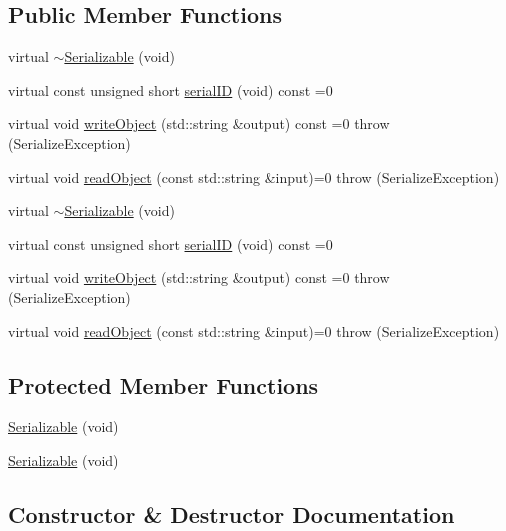 \subsection*{Public Member Functions}
\begin{DoxyCompactItemize}
\item 
virtual \mbox{\hyperlink{classFILEDB_1_1Serializable_aac7656fa828dd044ad98d50cb7de1084}{$\sim$\+Serializable}} (void)
\item 
virtual const unsigned short \mbox{\hyperlink{classFILEDB_1_1Serializable_a5d639b5dbd5d8ebc7dca1eca31bbc868}{serial\+ID}} (void) const =0
\item 
virtual void \mbox{\hyperlink{classFILEDB_1_1Serializable_a8deaa86e108c08c863881e46cf5578ea}{write\+Object}} (std\+::string \&output) const =0  throw (\+Serialize\+Exception)
\item 
virtual void \mbox{\hyperlink{classFILEDB_1_1Serializable_a21a5831fa4f65790490a8a5eba9fcab2}{read\+Object}} (const std\+::string \&input)=0  throw (\+Serialize\+Exception)
\item 
virtual \mbox{\hyperlink{classFILEDB_1_1Serializable_aac7656fa828dd044ad98d50cb7de1084}{$\sim$\+Serializable}} (void)
\item 
virtual const unsigned short \mbox{\hyperlink{classFILEDB_1_1Serializable_a5d639b5dbd5d8ebc7dca1eca31bbc868}{serial\+ID}} (void) const =0
\item 
virtual void \mbox{\hyperlink{classFILEDB_1_1Serializable_a8deaa86e108c08c863881e46cf5578ea}{write\+Object}} (std\+::string \&output) const =0  throw (\+Serialize\+Exception)
\item 
virtual void \mbox{\hyperlink{classFILEDB_1_1Serializable_a21a5831fa4f65790490a8a5eba9fcab2}{read\+Object}} (const std\+::string \&input)=0  throw (\+Serialize\+Exception)
\end{DoxyCompactItemize}
\subsection*{Protected Member Functions}
\begin{DoxyCompactItemize}
\item 
\mbox{\hyperlink{classFILEDB_1_1Serializable_a09ab427f4720be7429003f4c78adda16}{Serializable}} (void)
\item 
\mbox{\hyperlink{classFILEDB_1_1Serializable_a09ab427f4720be7429003f4c78adda16}{Serializable}} (void)
\end{DoxyCompactItemize}


\subsection{Constructor \& Destructor Documentation}
\mbox{\label{classFILEDB_1_1Serializable_aac7656fa828dd044ad98d50cb7de1084}} 
